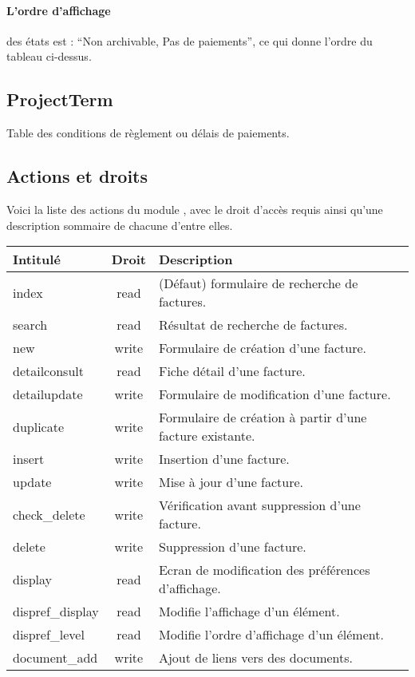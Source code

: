 \paragraph{L'ordre d'affichage} des états est : ``Non archivable, Pas de paiements'', ce qui donne l'ordre du tableau ci-dessus.


\subsection{ProjectTerm}
Table des conditions de règlement ou délais de paiements.



\subsection{Actions et droits}

Voici la liste des actions du module \invoice, avec le droit d'accès requis ainsi qu'une description sommaire de chacune d'entre elles.\\

\begin{tabular}{|l|c|p{9.5cm}|}
 \hline
 \textbf{Intitulé} & \textbf{Droit} & \textbf{Description} \\
 \hline
 \hline
  index & read & (Défaut) formulaire de recherche de factures. \\ 
 \hline
  search & read & Résultat de recherche de factures. \\
 \hline
  new & write & Formulaire de création d'une facture. \\
 \hline
  detailconsult & read & Fiche détail d'une facture. \\
 \hline
  detailupdate & write & Formulaire de modification d'une facture. \\
 \hline
  duplicate & write & Formulaire de création à partir d'une facture existante. \\
 \hline
  insert & write & Insertion d'une facture. \\
 \hline
  update & write & Mise à jour d'une facture. \\
 \hline
  check\_delete & write & Vérification avant suppression d'une facture. \\
 \hline
  delete & write & Suppression d'une facture. \\
 \hline
  display & read & Ecran de modification des préférences d'affichage. \\
 \hline
  dispref\_display & read & Modifie l'affichage d'un élément. \\
 \hline
  dispref\_level & read & Modifie l'ordre d'affichage d'un élément. \\
 \hline
  document\_add & write & Ajout de liens vers des documents. \\
 \hline
\end{tabular}
